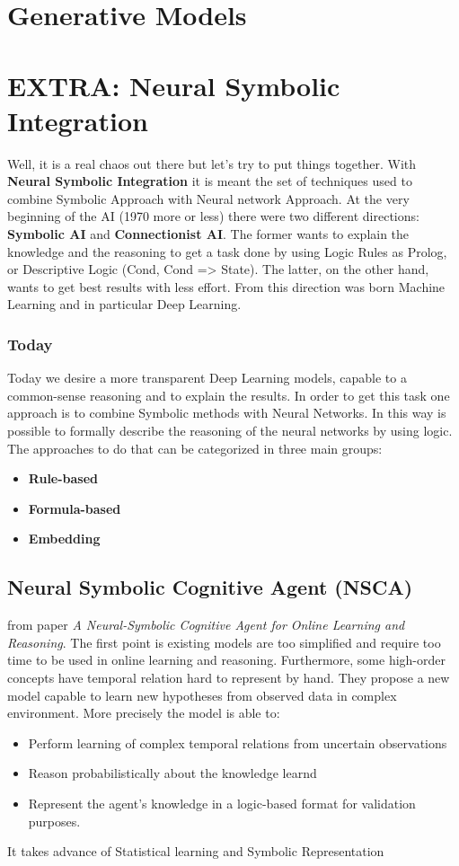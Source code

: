 \documentclass[12pt,a4paper,twoside,openright]{scrbook}
\begin{document}
\chapter{Generative Models}


\chapter{EXTRA: Neural Symbolic Integration}

Well, it is a real chaos out there but let's try to put things together. With \textbf{Neural Symbolic Integration} it is meant the set of techniques used to combine Symbolic Approach with Neural network Approach. At the very beginning of the AI (1970 more or less) there were two different directions: \textbf{Symbolic AI} and \textbf{Connectionist AI}. The former wants to explain the knowledge and the reasoning to get a task done by using Logic Rules as Prolog, or Descriptive Logic (Cond, Cond => State). The latter, on the other hand, wants to get best results with less effort. From this direction was born Machine Learning and in particular Deep Learning. 

\subsection{Today}

Today we desire a more transparent Deep Learning models, capable to a common-sense reasoning and to explain the results. In order to get this task one approach is to combine Symbolic methods with Neural Networks. In this way is possible to formally describe the reasoning of the neural networks by using logic. The approaches to do that can be categorized in three main groups:
\begin{itemize}
\item \textbf{Rule-based}
\item \textbf{Formula-based}
\item \textbf{Embedding}
\end{itemize}
 
 \section{Neural Symbolic Cognitive Agent (NSCA) }
 from paper \textit{A Neural-Symbolic Cognitive Agent for Online Learning and Reasoning}.
 The first point is existing models are too simplified and require too time to be used in online learning and reasoning. Furthermore, some high-order concepts have temporal relation hard to represent by hand. They propose a new model capable to learn new hypotheses from observed data in complex environment. More precisely the model is able to:
 \begin{itemize}
  \item Perform learning of complex temporal relations from uncertain observations
   \item Reason probabilistically  about the knowledge learnd
   \item Represent the  agent's knowledge in a logic-based format for validation purposes.
  \end{itemize} 
  It takes advance of Statistical learning and Symbolic Representation
\end{document}
